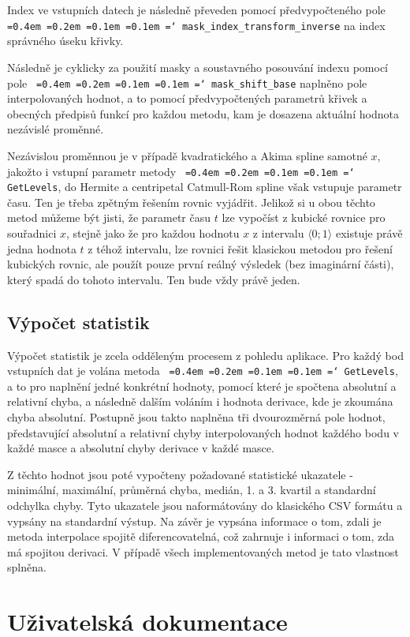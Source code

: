 \documentclass[]{thesiskiv}
\newcommand*\justify{
  \fontdimen2\font=0.4em
  \fontdimen3\font=0.2em
  \fontdimen4\font=0.1em
  \fontdimen7\font=0.1em
  \hyphenchar\font=`\-
}
\begin{document}
Index ve vstupních datech je následně převeden pomocí předvypočteného pole \texttt{\justify mask\_index\_transform\_inverse} na index správného úseku křivky.

Následně je cyklicky za použití masky a soustavného posouvání indexu pomocí pole \texttt{\justify mask\_shift\_base} naplněno pole interpolovaných hodnot, a to pomocí předvypočtených parametrů křivek a obecných předpisů funkcí pro každou metodu, kam je dosazena aktuální hodnota nezávislé proměnné.

Nezávislou proměnnou je v případě kvadratického a Akima spline samotné $x$, jakožto i vstupní parametr metody \texttt{\justify GetLevels}, do Hermite a centripetal Catmull-Rom spline však vstupuje parametr času. Ten je třeba zpětným řešením rovnic vyjádřit. Jelikož si u obou těchto metod můžeme být jisti, že parametr času $t$ lze vypočíst z kubické rovnice pro souřadnici $x$, stejně jako že pro každou hodnotu $x$ z intervalu $\langle 0 ; 1 \rangle$ existuje právě jedna hodnota $t$ z téhož intervalu, lze rovnici řešit klasickou metodou pro řešení kubických rovnic, ale použít pouze první reálný výsledek (bez imaginární části), který spadá do tohoto intervalu. Ten bude vždy právě jeden.

\section{Výpočet statistik}

Výpočet statistik je zcela odděleným procesem z pohledu aplikace. Pro každý bod vstupních dat je volána metoda \texttt{\justify GetLevels}, a to pro naplnění jedné konkrétní hodnoty, pomocí které je spočtena absolutní a relativní chyba, a následně dalším voláním i hodnota derivace, kde je zkoumána chyba absolutní. Postupně jsou takto naplněna tři dvourozměrná pole hodnot, představující absolutní a relativní chyby interpolovaných hodnot každého bodu v každé masce a absolutní chyby derivace v každé masce.

Z těchto hodnot jsou poté vypočteny požadované statistické ukazatele - minimální, maximální, průměrná chyba, medián, 1. a 3. kvartil a standardní odchylka chyby. Tyto ukazatele jsou naformátovány do klasického CSV formátu a vypsány na standardní výstup. Na závěr je vypsána informace o tom, zdali je metoda interpolace spojitě diferencovatelná, což zahrnuje i informaci o tom, zda má spojitou derivaci. V případě všech implementovaných metod je tato vlastnost splněna.

\chapter{Uživatelská dokumentace}
\end{document}
